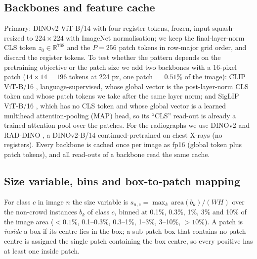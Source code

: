 \documentclass[10pt,letterpaper,twocolumn]{article}
\begin{document}
\subsection{Backbones and feature cache}
\label{sec:backbones}
Primary: DINOv2 ViT-B/14 with four register tokens, frozen, input squash-resized to
$224\times224$ with ImageNet normalisation; we keep the final-layer-norm CLS token
$z_0\in\mathbb{R}^{768}$ and the $P=256$ patch tokens in row-major grid order, and discard the
register tokens. To test whether the pattern depends on the pretraining objective or the
patch size we add two backbones with a 16-pixel patch ($14\times14=196$ tokens at 224 px, one
patch $=0.51\%$ of the image): CLIP ViT-B/16 \citep{radford2021clip}, language-supervised,
whose global vector is the post-layer-norm CLS token and whose patch tokens we take after the
same layer norm; and SigLIP ViT-B/16 \citep{zhai2023siglip}, which has no CLS token and whose
global vector is a learned multihead attention-pooling (MAP) head, so its ``CLS'' read-out is
already a trained attention pool over the patches. For the radiographs we use DINOv2 and
RAD-DINO \citep{perezgarcia2025raddino}, a DINOv2-B/14 continued-pretrained on chest X-rays
(no registers). Every backbone is cached once per image as fp16 (global token plus patch
tokens), and all read-outs of a backbone read the same cache.
\subsection{Size variable, bins and box-to-patch mapping}
\label{sec:bins}
For class $c$ in image $n$ the size variable is $s_{n,c}=\max_{k}\,\mathrm{area}(b_k)/(W H)$
over the non-crowd instances $b_k$ of class $c$, binned at 0.1\%, 0.3\%, 1\%, 3\% and 10\%
of the image area ($<0.1\%$, 0.1--0.3\%, 0.3--1\%, 1--3\%, 3--10\%, $>10\%$). A patch is \emph{inside} a box if its centre lies in the
box; a sub-patch box that contains no patch centre is assigned the single patch containing the
box centre, so every positive has at least one inside patch.
\end{document}
